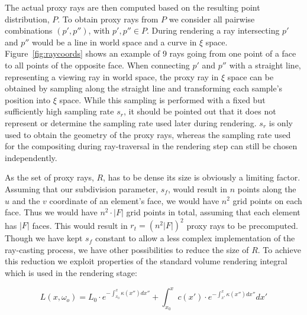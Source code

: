 \documentclass[journal]{vgtc}                %
\begin{document}
The actual proxy rays are then computed based on the resulting point distribution, $P$. To obtain proxy rays from $P$ we consider all pairwise combinations $(p',p'')$, with $p',p'' \in P$. During rendering a ray intersecting $p'$ and $p''$ would be a line in world space and a curve in $\xi$ space. Figure~\ref{fig:raycoords} shows an example of 9 rays going from one point of a face to all points of the opposite face. When connecting $p'$ and $p''$ with a straight line, representing a viewing ray in world space, the proxy ray in $\xi$ space can be obtained by sampling along the straight line and transforming each sample's position into $\xi$ space. While this sampling is performed with a fixed but sufficiently high sampling rate $s_r$, it should be pointed out that it does not represent or determine the sampling rate used later during rendering. $s_r$ is only used to obtain the geometry of the proxy rays, whereas the sampling rate used for the compositing during ray-traversal in the rendering step can still be chosen independently.

As the set of proxy rays, $R$, has to be dense its size is obviously a limiting factor. Assuming that our subdivision parameter, $s_f$, would result in $n$ points along the $u$ and the $v$ coordinate of an element's face, we would have $n^2$ grid points on each face. Thus we would have \mbox{$n^2\cdot\left|F\right|$} grid points in total, assuming that each element has $\left|F\right|$ faces. This would result in $r_t = (n^2 \left|F\right|)^2$ proxy rays to be precomputed. Though we have kept $s_f$ constant to allow a less complex implementation of the ray-casting process, we have other possibilities to reduce the size of $R$. To achieve this reduction we exploit properties of the standard volume rendering integral which is used in the rendering stage:

$$ L(x,\omega_o) = L_0 \cdot e^{-\int_{x_0}^{x}\kappa(x'')dx''} + \int_{x_0}^{x}  \! c(x') \cdot e^{-\int_{x'}^{x}\kappa(x'')dx''} dx'$$
\end{document}
